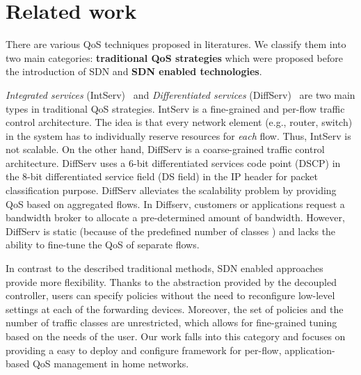 \section{Related work}
\label{sect:related}

There are various QoS techniques  proposed in literatures. We classify them into two main
categories: \textbf{traditional QoS strategies} which were proposed before the introduction of SDN and
\textbf{SDN enabled technologies}.

\emph{Integrated services} (IntServ)~\cite{IntServ} and \emph{Differentiated services} (DiffServ)~\cite{DiffServ}
are two main types in traditional QoS strategies. IntServ is a fine-grained and per-flow traffic control architecture.
The idea is that every network element (e.g., router, switch) in the system has to individually reserve resources for
\emph{each} flow. Thus, IntServ is not scalable. On the other hand, DiffServ is a coarse-grained traffic control
architecture. DiffServ uses a 6-bit differentiated services code point (DSCP) in the 8-bit differentiated service field
(DS field) in the IP header for packet classification purpose. DiffServ alleviates the scalability problem by providing
QoS based on aggregated flows.  In Diffserv, customers or applications request a bandwidth broker to allocate a pre-determined
amount of bandwidth. However, DiffServ is static (because of the predefined number of classes ) and lacks the ability to
fine-tune the QoS of separate flows.

In contrast to the described traditional methods, SDN enabled approaches provide more flexibility. Thanks to the abstraction
provided by the decoupled controller, users can specify policies without the need to reconfigure low-level settings at each
of the forwarding devices. Moreover, the set of policies and the number of traffic classes are unrestricted, which allows for
fine-grained tuning based on the needs of the user. Our work falls into this category and focuses on providing a easy to deploy
and configure framework for per-flow, application-based QoS management in home networks.

